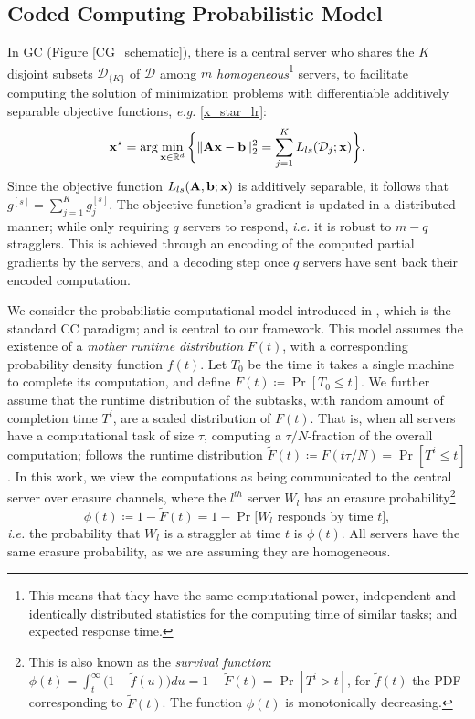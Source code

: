 \documentclass[journal,letterpaper,onecolumn,twoside,nofonttune]{IEEEtran}
\newcommand{\R}{\mathbb{R}}
\newcommand{\D}{\mathcal{D}}
\newcommand{\bb}{\bold{b}}
\newcommand{\xb}{\bold{x}}
\newcommand{\Ab}{\bold{A}}
\newcommand{\Ft}{\tilde{F}}
\begin{document}
\subsection{Coded Computing Probabilistic Model}
\label{CC_model}

In GC (Figure \ref{CG_schematic}), there is a central server who shares the $K$ disjoint subsets $\D_{\{K\}}$ of $\D$ among $m$ \textit{homogeneous}\footnote{ This means that they have the same computational power, independent and identically distributed statistics for the computing time of similar tasks; and expected response time.}
servers, to facilitate computing the solution of minimization problems with differentiable additively separable objective functions, \textit{e.g.} \eqref{x_star_lr}:
\begin{equation}
\label{sep_ls_obj}  %
  \xb^\star = \arg\min_{\xb\in\R^d}\bigg\{\|\Ab\xb-\bb\|_2^2=\sum_{j=1}^KL_{ls}(\D_j;\xb)\bigg\}.
\end{equation}
Since the objective function $L_{ls}(\Ab,\bb;\xb)$ is additively separable, it follows that $g^{[s]}=\sum_{j=1}^Kg_j^{[s]}$. The objective function's gradient is updated in a distributed manner; while only requiring $q$ servers to respond, \textit{i.e.} it is robust to $m-q$ stragglers. This is achieved through an encoding of the computed partial gradients by the servers, and a decoding step once $q$ servers have sent back their encoded computation.

We consider the probabilistic computational model introduced in \cite{LLPPR17}, which is the standard CC paradigm; and is central to our framework. This model assumes the existence of a \textit{mother runtime distribution} $F(t)$, with a corresponding probability density function $f(t)$. Let $T_0$ be the time it takes a single machine to complete its computation, and define $F(t)\coloneqq\Pr[T_0\leqslant t]$. We further assume that the runtime distribution of the subtasks, with random amount of completion time $T^i$, are a scaled distribution of $F(t)$. That is, when all servers have a computational task of size $\tau$, computing a $\tau/N$-fraction of the overall computation; follows the runtime distribution $\Ft(t)\coloneqq F(t\tau/N)=\Pr[T^i\leqslant t]$. In this work, we view the computations as being communicated to the central server over erasure channels, where the $l^{th}$ server $W_l$ has an erasure probability\footnote{This is also known as the \textit{survival function}: $\phi(t)=\int_{t}^{\infty}\big(1-\tilde{f}(u)\big)du=1-\Ft(t)=\Pr[T^i>t]$, for $\tilde{f}(t)$ the PDF corresponding to $\Ft(t)$. The function $\phi(t)$ is monotonically decreasing.}%
\begin{equation}
\label{eras_prob}
   \phi(t)\coloneqq1-\Ft(t)=1-\Pr\big[W_l \text{ responds by time } t\big],
\end{equation}
\textit{i.e.} the probability that $W_l$ is a straggler at time $t$ is $\phi(t)$. All servers have the same erasure probability, as we are assuming they are homogeneous.
\end{document}
